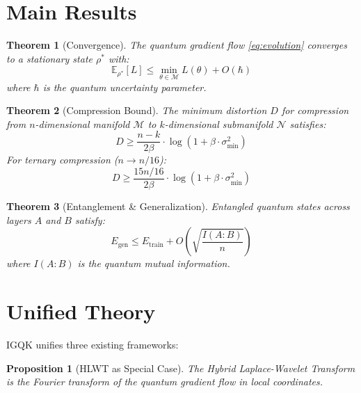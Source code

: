\documentclass[11pt,a4paper]{article}
\newtheorem{theorem}{Theorem}
\newtheorem{proposition}{Proposition}
\begin{document}
\section{Main Results}

\begin{theorem}[Convergence]
\label{thm:convergence}
The quantum gradient flow \eqref{eq:evolution} converges to a stationary state $\rho^*$ with:
\begin{equation}
    \mathbb{E}_{\rho^*}[L] \leq \min_{\theta \in \mathcal{M}} L(\theta) + O(\hbar)
\end{equation}
where $\hbar$ is the quantum uncertainty parameter.
\end{theorem}

\begin{theorem}[Compression Bound]
\label{thm:compression}
The minimum distortion $D$ for compression from $n$-dimensional manifold $\mathcal{M}$ to $k$-dimensional submanifold $\mathcal{N}$ satisfies:
\begin{equation}
    D \geq \frac{n-k}{2\beta} \cdot \log(1 + \beta \cdot \sigma^2_{\min})
\end{equation}
For ternary compression ($n \to n/16$):
\begin{equation}
    D \geq \frac{15n/16}{2\beta} \cdot \log(1 + \beta \cdot \sigma^2_{\min})
\end{equation}
\end{theorem}

\begin{theorem}[Entanglement \& Generalization]
\label{thm:entanglement}
Entangled quantum states across layers $A$ and $B$ satisfy:
\begin{equation}
    E_{\text{gen}} \leq E_{\text{train}} + O\left(\sqrt{\frac{I(A:B)}{n}}\right)
\end{equation}
where $I(A:B)$ is the quantum mutual information.
\end{theorem}

\section{Unified Theory}

IGQK unifies three existing frameworks:

\begin{proposition}[HLWT as Special Case]
The Hybrid Laplace-Wavelet Transform is the Fourier transform of the quantum gradient flow in local coordinates.
\end{proposition}
\end{document}

